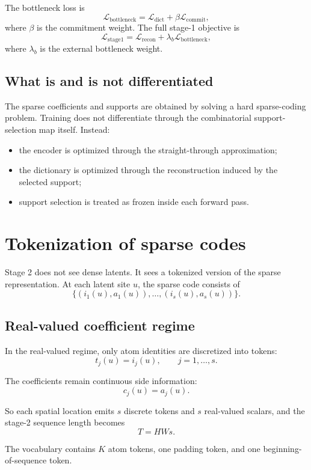 \documentclass[11pt]{article}
\begin{document}
The bottleneck loss is
\[
\mathcal{L}_{\text{bottleneck}}
=
\mathcal{L}_{\text{dict}}
+
\beta \mathcal{L}_{\text{commit}},
\]
where $\beta$ is the commitment weight. The full stage-1 objective is
\[
\mathcal{L}_{\text{stage1}}
=
\mathcal{L}_{\text{recon}}
+
\lambda_b \mathcal{L}_{\text{bottleneck}},
\]
where $\lambda_b$ is the external bottleneck weight.

\subsection{What is and is not differentiated}

The sparse coefficients and supports are obtained by solving a hard sparse-coding problem. Training does not differentiate through the combinatorial support-selection map itself. Instead:
\begin{itemize}
  \item the encoder is optimized through the straight-through approximation;
  \item the dictionary is optimized through the reconstruction induced by the selected support;
  \item support selection is treated as frozen inside each forward pass.
\end{itemize}

\section{Tokenization of sparse codes}

Stage 2 does not see dense latents. It sees a tokenized version of the sparse representation. At each latent site $u$, the sparse code consists of
\[
\{(i_1(u), a_1(u)), \dots, (i_s(u), a_s(u))\}.
\]

\subsection{Real-valued coefficient regime}

In the real-valued regime, only atom identities are discretized into tokens:
\[
t_j(u) = i_j(u), \qquad j=1,\dots,s.
\]

The coefficients remain continuous side information:
\[
c_j(u) = a_j(u).
\]

So each spatial location emits $s$ discrete tokens and $s$ real-valued scalars, and the stage-2 sequence length becomes
\[
T = H W s.
\]

The vocabulary contains $K$ atom tokens, one padding token, and one beginning-of-sequence token.
\end{document}
